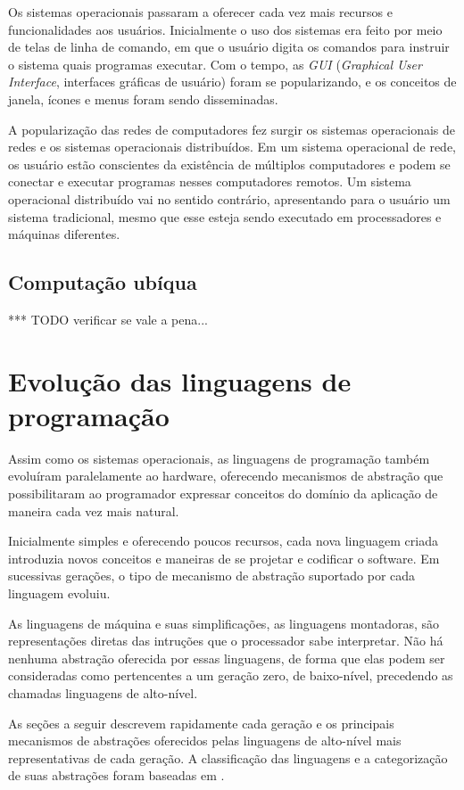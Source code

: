 \documentclass[11pt,twoside,a4paper]{book}
\begin{document}
Os sistemas operacionais passaram a oferecer cada vez mais recursos e funcionalidades aos usuários. Inicialmente o uso dos sistemas era feito por meio de telas de linha de comando, em que o usuário digita os comandos para instruir o sistema quais programas executar. Com o tempo, as \emph{GUI} (\emph{Graphical User Interface}, interfaces gráficas de usuário) foram se popularizando, e os conceitos de janela, ícones e menus foram sendo disseminadas.

A popularização das redes de computadores fez surgir os sistemas operacionais de redes e os sistemas operacionais distribuídos. Em um sistema operacional de rede, os usuário estão conscientes da existência de múltiplos computadores e podem se conectar e executar programas nesses computadores remotos. Um sistema operacional distribuído vai no sentido contrário, apresentando para o usuário um sistema tradicional, mesmo que esse esteja sendo executado em processadores e máquinas diferentes.

\subsection*{Computação ubíqua}
*** TODO verificar se vale a pena...

\section{Evolução das linguagens de programação}
\label{sec:evolucao_linguagens_programacao}
Assim como os sistemas operacionais, as linguagens de programação também evoluíram paralelamente ao hardware, oferecendo mecanismos de abstração que possibilitaram ao programador expressar conceitos do domínio da aplicação de maneira cada vez mais natural.

Inicialmente simples e oferecendo poucos recursos, cada nova linguagem criada introduzia novos conceitos e maneiras de se projetar e codificar o software. Em sucessivas gerações, o tipo de mecanismo de abstração suportado por cada linguagem evoluiu. 

As linguagens de máquina e suas simplificações, as linguagens montadoras, são representações diretas das intruções que o processador sabe interpretar. Não há nenhuma abstração oferecida por essas linguagens, de forma que elas podem ser consideradas como pertencentes a um geração zero, de baixo-nível, precedendo as chamadas linguagens de alto-nível.

As seções a seguir descrevem rapidamente cada geração e os principais mecanismos de abstrações oferecidos pelas linguagens  de alto-nível mais representativas de cada geração. A classificação das linguagens e a categorização de suas abstrações foram baseadas em \cite{booch}.
\end{document}
